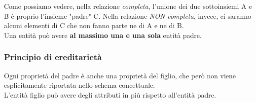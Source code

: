 \documentclass[12pt, a4paper]{article}
\begin{document}
    Come possiamo vedere, nella relazione  \textit{completa}, l'unione dei due sottoinsiemi A e B è proprio 
    l'insieme "padre" C. Nella relazione \textit{NON completa}, invece, ci saranno alcuni elementi di C che non fanno
    parte ne di A e ne di B.
    \\
    Una entità può avere \textbf{al massimo una e una sola} entità padre.

    \subsubsection{Principio di ereditarietà}
    Ogni proprietà del padre è anche una proprietà del figlio, che però non viene esplicitamente riportata nello schema concettuale.
    \\L'entità figlio può avere degli attributi in più rispetto all'entità padre.



    
\end{document}
